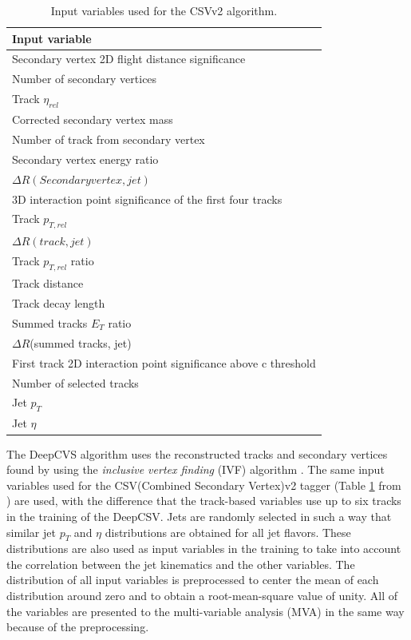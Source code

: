 \begin{table}[htbp]
    \caption{Input variables used for the CSVv2 algorithm.}
    \centering
    \begin{tabular}{l}
        \hline
        Input variable                                            \\ 
        \hline 
        Secondary vertex 2D flight distance significance\\
        Number of secondary vertices\\
        Track $\eta_{rel}$\\
        Corrected secondary vertex mass\\
        Number of track from secondary vertex\\
        Secondary vertex energy ratio\\
        $\Delta R (Secondary vertex, jet)$ \\
        3D interaction point significance of the first four tracks\\
        Track $p_{T,rel}$\\
        $\Delta R (track, jet)$ \\
        Track $p_{T,rel}$ ratio\\
        Track distance\\
        Track decay length\\
        Summed tracks $E_{T}$ ratio\\
        $\Delta R$(summed tracks, jet)\\
        First track 2D interaction point significance above c threshold\\
        Number of selected tracks\\
        Jet $p_{T}$\\
        Jet $\eta$\\
        \hline 
    \end{tabular}
    \label{tab:csvv2var}
\end{table}

The DeepCVS algorithm uses the reconstructed tracks and secondary vertices found by using the \textit{inclusive vertex finding} (IVF) algorithm \cite{ADAM2007781}. The same input variables used for the CSV(Combined Secondary Vertex)v2 tagger (Table \ref{tab:csvv2var} from \cite{Sirunyan_2018}) are used, with the difference that the track-based variables use up to six tracks in the training of the DeepCSV. Jets are randomly selected in such a way that similar jet $p_{T}$ and $\eta$ distributions are obtained for all jet flavors. These distributions are also used as input variables in the training to take into account the correlation between the jet kinematics and the other variables. The distribution of all input variables is preprocessed to center the mean of each distribution around zero and to obtain a root-mean-square value of unity. All of the variables are presented to the multi-variable analysis (MVA) in the same way because of the preprocessing.

